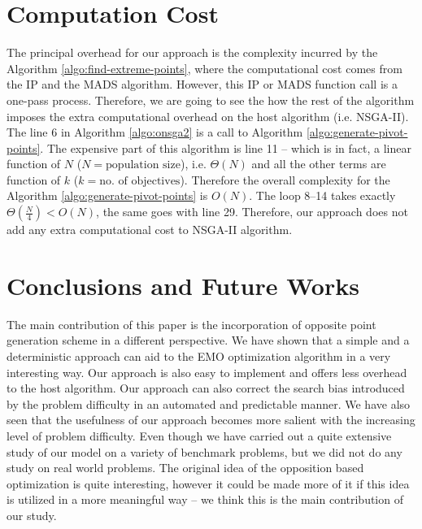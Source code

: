 \documentclass[journal]{IEEEtran}
\begin{document}
\section{Computation Cost}
\label{sec:big-o}
The principal overhead for our approach is the complexity incurred by the Algorithm \ref{algo:find-extreme-points}, where the computational cost comes from the IP and the MADS algorithm. However, this IP or MADS function call is a one-pass process. Therefore, we are going to see the how the rest of the algorithm imposes the extra computational overhead on the host algorithm (i.e. NSGA-II). The line 6 in Algorithm \ref{algo:onsga2} is a call to Algorithm \ref{algo:generate-pivot-points}. The expensive part of this algorithm is line 11 -- which is in fact, a linear function of \(N\) (\(N = \text{population size}\)), i.e. \(\Theta(N)\) and all the other terms are function of \(k\) (\(k = \text{no. of objectives}\)). Therefore the overall complexity for the Algorithm \ref{algo:generate-pivot-points} is \(O(N)\). The loop 8--14 takes exactly \(\Theta(\frac{N}{4}) < O(N)\), the same goes with line 29. Therefore, our approach does not add any extra computational cost to NSGA-II algorithm.

\section{Conclusions and Future Works}
\label{sec:conclusion}
The main contribution of this paper is the incorporation of opposite point generation scheme in a different perspective. We have shown that a simple and a deterministic approach can aid to the EMO optimization algorithm in a very interesting way. Our approach is also easy to implement and offers less overhead to the host algorithm. Our approach can also correct the search bias introduced by the problem difficulty in an automated and predictable manner. We have also seen that the usefulness of our approach becomes more salient with the increasing level of problem difficulty. Even though we have carried out a quite extensive study of our model on a variety of benchmark problems, but we did not do any study on real world problems. The original idea of the opposition based optimization is quite interesting, however it could be made more of it if this idea is utilized in a more meaningful way -- we think this is the main contribution of our study.  
\end{document}
